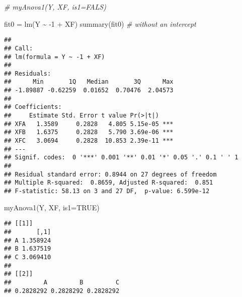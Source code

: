 \documentclass[
  11pt,
]{article}
\newenvironment{Shaded}{\begin{snugshade}}{\end{snugshade}}
\newcommand{\AttributeTok}[1]{\textcolor[rgb]{0.77,0.63,0.00}{#1}}
\newcommand{\CommentTok}[1]{\textcolor[rgb]{0.56,0.35,0.01}{\textit{#1}}}
\newcommand{\ConstantTok}[1]{\textcolor[rgb]{0.00,0.00,0.00}{#1}}
\newcommand{\DecValTok}[1]{\textcolor[rgb]{0.00,0.00,0.81}{#1}}
\newcommand{\FunctionTok}[1]{\textcolor[rgb]{0.00,0.00,0.00}{#1}}
\newcommand{\NormalTok}[1]{#1}
\newcommand{\OtherTok}[1]{\textcolor[rgb]{0.56,0.35,0.01}{#1}}
\newcommand{\SpecialCharTok}[1]{\textcolor[rgb]{0.00,0.00,0.00}{#1}}
\begin{document}
\begin{Shaded}
\begin{Highlighting}[]
\CommentTok{\# myAnova1(Y, XF, is1=FALS)}
\end{Highlighting}
\end{Shaded}

\begin{Shaded}
\begin{Highlighting}[]
\NormalTok{fit0 }\OtherTok{=} \FunctionTok{lm}\NormalTok{(Y }\SpecialCharTok{\textasciitilde{}} \SpecialCharTok{{-}}\DecValTok{1} \SpecialCharTok{+}\NormalTok{ XF)}
\FunctionTok{summary}\NormalTok{(fit0) }\CommentTok{\# without an intercept}
\end{Highlighting}
\end{Shaded}

\begin{verbatim}
## 
## Call:
## lm(formula = Y ~ -1 + XF)
## 
## Residuals:
##      Min       1Q   Median       3Q      Max 
## -1.89887 -0.62259  0.01652  0.70476  2.04573 
## 
## Coefficients:
##     Estimate Std. Error t value Pr(>|t|)    
## XFA   1.3589     0.2828   4.805 5.15e-05 ***
## XFB   1.6375     0.2828   5.790 3.69e-06 ***
## XFC   3.0694     0.2828  10.853 2.39e-11 ***
## ---
## Signif. codes:  0 '***' 0.001 '**' 0.01 '*' 0.05 '.' 0.1 ' ' 1
## 
## Residual standard error: 0.8944 on 27 degrees of freedom
## Multiple R-squared:  0.8659, Adjusted R-squared:  0.851 
## F-statistic: 58.13 on 3 and 27 DF,  p-value: 6.599e-12
\end{verbatim}

\begin{Shaded}
\begin{Highlighting}[]
\FunctionTok{myAnova1}\NormalTok{(Y, XF, }\AttributeTok{is1=}\ConstantTok{TRUE}\NormalTok{)}
\end{Highlighting}
\end{Shaded}

\begin{verbatim}
## [[1]]
##       [,1]
## A 1.358924
## B 1.637519
## C 3.069410
## 
## [[2]]
##         A         B         C 
## 0.2828292 0.2828292 0.2828292
\end{verbatim}
\end{document}
